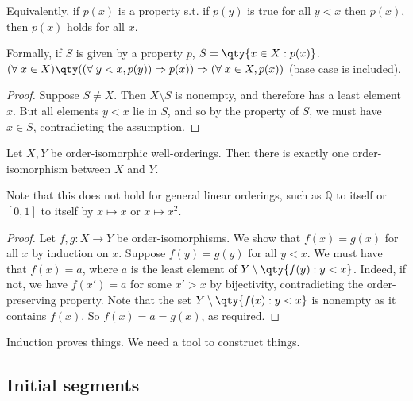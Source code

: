 \begin{remark}
    Equivalently, if $p(x)$ is a property s.t. if $p(y)$ is true for all $y < x$ then $p(x)$, then $p(x)$ holds for all $x$.

    Formally, if $S$ is given by a property $p$, $S = \qty{x \in X : p(x)}$. \\
    $(\forall \; x \in X)\qty((\forall \; y < x, p(y)) \implies p(x)) \implies (\forall \; x \in X, p(x))$ (base case is included).
\end{remark}

\begin{proof}
    Suppose $S \neq X$.
    Then $X \setminus S$ is nonempty, and therefore has a least element $x$.
    But all elements $y < x$ lie in $S$, and so by the property of $S$, we must have $x \in S$, contradicting the assumption.
\end{proof}

\begin{proposition}
    Let $X, Y$ be order-isomorphic well-orderings.
    Then there is exactly one order-isomorphism between $X$ and $Y$.
\end{proposition}

Note that this does not hold for general linear orderings, such as $\mathbb Q$ to itself or $[0,1]$ to itself by $x \mapsto x$ or $x \mapsto x^2$.

\begin{proof}
    Let $f, g \colon X \to Y$ be order-isomorphisms.
    We show that $f(x) = g(x)$ for all $x$ by induction on $x$.
    Suppose $f(y) = g(y)$ for all $y < x$.
    We must have that $f(x) = a$, where $a$ is the least element of $Y \setminus \qty{f(y) : y < x}$.
    Indeed, if not, we have $f(x') = a$ for some $x' > x$ by bijectivity, contradicting the order-preserving property.
    Note that the set $Y \setminus \qty{f(x) : y < x}$ is nonempty as it contains $f(x)$.
    So $f(x) = a = g(x)$, as required.
\end{proof}

\begin{remark}
    Induction proves things.
    We need a tool to construct things.
\end{remark}

\subsection{Initial segments}


